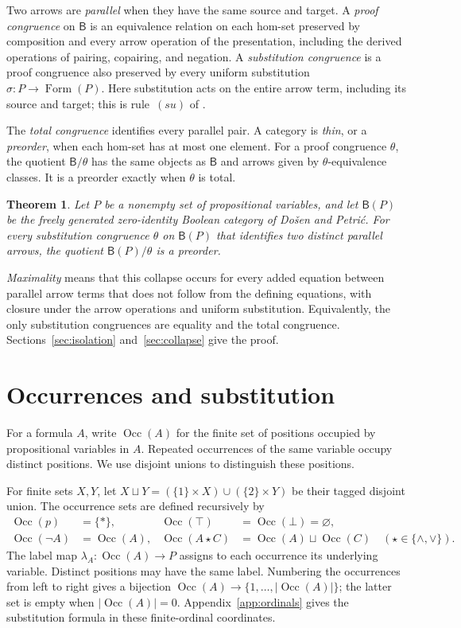 \documentclass[11pt]{article}
\newtheorem{theorem}{Theorem}[section]
\newcommand{\B}{\mathsf B}
\newcommand{\Occ}{\operatorname{Occ}}
\newcommand{\FormulaSet}{\operatorname{Form}}
\begin{document}
Two arrows are \emph{parallel} when they have the same source and
target. A \emph{proof congruence} on $\B$ is an equivalence relation
on each hom-set preserved by composition and every arrow operation
of the presentation, including the derived operations of pairing,
copairing, and negation.
A \emph{substitution congruence} is a proof congruence also preserved
by every uniform substitution $\sigma:P\to\FormulaSet(P)$.
Here substitution acts on the entire arrow term, including its source
and target; this is rule~$(su)$ of \cite[\S2.7, p.~51]{DP}.

The \emph{total congruence} identifies every parallel pair. A category
is \emph{thin}, or a \emph{preorder}, when each hom-set has at most one
element. For a proof congruence $\theta$, the quotient $\B/\theta$
has the same objects as $\B$ and arrows given by $\theta$-equivalence
classes. It is a preorder exactly when $\theta$ is total.

\begin{theorem}\label{thm:main}
Let $P$ be a nonempty set of propositional variables, and let
$\B(P)$ be the freely generated zero-identity Boolean category of
Do\v{s}en and Petri\'c. For every substitution congruence $\theta$
on $\B(P)$ that identifies two distinct parallel arrows, the
quotient $\B(P)/\theta$ is a preorder.
\end{theorem}

\emph{Maximality} means that this collapse occurs for every added
equation between parallel arrow terms that does not follow from the
defining equations, with closure under the arrow operations and
uniform substitution. Equivalently, the only substitution
congruences are equality and the total congruence.
Sections~\ref{sec:isolation} and~\ref{sec:collapse} give the proof.

\section{Occurrences and substitution}\label{sec:occurrences}

For a formula $A$, write $\Occ(A)$ for the finite set of positions
occupied by propositional variables in $A$. Repeated occurrences of the
same variable occupy distinct positions. We use disjoint unions to
distinguish these positions.

For finite sets $X,Y$, let
$X\sqcup Y=(\{1\}\times X)\cup(\{2\}\times Y)$ be their tagged
disjoint union. The occurrence sets are defined recursively by
\[
 \begin{aligned}
 \Occ(p)&=\{*\},&
 \Occ(\top)&=\Occ(\bot)=\varnothing,\\
 \Occ(\neg A)&=\Occ(A),&
 \Occ(A\mathbin\star C)&=\Occ(A)\sqcup\Occ(C)
       \quad(\star\in\{\wedge,\vee\}).
 \end{aligned}
\]
The label map $\lambda_A:\Occ(A)\to P$ assigns to each occurrence
its underlying variable. Distinct positions may have the same label.
Numbering the occurrences from left to right gives a bijection
$\Occ(A)\to\{1,\ldots,|\Occ(A)|\}$; the latter set is empty when
$|\Occ(A)|=0$. Appendix~\ref{app:ordinals} gives the substitution
formula in these finite-ordinal coordinates.
\end{document}
